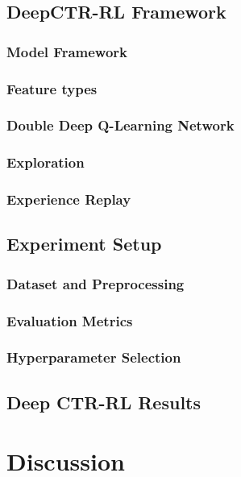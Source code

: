 \documentclass{mldsmsc}
\begin{document}
\section{DeepCTR-RL Framework}

\subsection{Model Framework}

\subsection{Feature types}

\subsection{Double Deep Q-Learning Network}

\subsection{Exploration}

\subsection{Experience Replay}

\section{Experiment Setup}

\subsection{Dataset and Preprocessing}

\subsection{Evaluation Metrics}

\subsection{Hyperparameter Selection}

\section{Deep CTR-RL Results}

\chapter{Discussion}
\label{chap:discussion}
\end{document}
